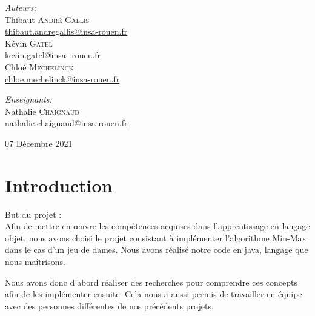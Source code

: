 \documentclass[12,french]{report}
\begin{document}
\begin{titlepage}
\begin{center}
	\begin{minipage}{0.4\textwidth}
		\begin{flushleft} \large
			\emph{Auteurs:}\\
			Thibaut \textsc{André-Gallis} \\
			{\small\href{mailto:thibaut.andregallis@insa-rouen.fr}{thibaut.andregallis@insa-rouen.fr}} \\
			Kévin \textsc{Gatel} \\
			{\small\href{mailto:kevin.gatel@insa-rouen.fr}{kevin.gatel@insa-				rouen.fr}}\\
			Chloé \textsc{Mechelinck} \\
			{\small\href{mailto:chloe.mechelinck@insa-rouen.fr}{chloe.mechelinck@insa-rouen.fr}}
		\end{flushleft}
	\end{minipage}
	\begin{minipage}{0.4\textwidth}
		\begin{flushright} \large
			\emph{Enseignants:} \\
			Nathalie \textsc{Chaignaud} \\
			{\small\href{mailto:nathalie.chaignaud@insa-rouen.fr}								{nathalie.chaignaud@insa-rouen.fr}}\\
		\end{flushright}
	\end{minipage}

	\vfill
	{\large 07 Décembre 2021}
\end{center}
\end{titlepage}

\tableofcontents


\renewcommand{\chaptername}{}

\chapter*{Introduction}

But du projet : \\

Afin de mettre en œuvre les compétences acquises dans l'apprentissage en langage objet, nous avons choisi le projet consistant à implémenter l'algorithme Min-Max dans le cas d'un jeu de dames. Nous avons réalisé notre code en java, langage que nous maîtrisons.

Nous avons donc d'abord réaliser des recherches pour comprendre ces concepts afin de les implémenter ensuite. Cela nous a aussi permis de travailler en équipe avec des personnes différentes de nos précédents projets.
\end{document}
